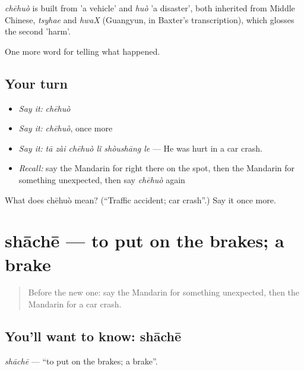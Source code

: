 \begin{cousinweb}
\emph{chēhuò} is built from  'a vehicle' and \emph{huò} 'a disaster', both inherited from Middle Chinese, \emph{tsyhae} and \emph{hwaX} (Guangyun, in Baxter's transcription), which glosses the second 'harm'.
\end{cousinweb}

\begin{grammarlens}[title={What you've built}]
One more word for telling what happened.
\end{grammarlens}

\subsection*{Your turn}
\begin{itemize}
\raggedright
  \item \emph{Say it:} \emph{chēhuò}
  \item \emph{Say it:} \emph{chēhuò}, once more
  \item \emph{Say it:} \emph{tā zài chēhuò lǐ shòushāng le} — He was hurt in a car crash.
  \item \emph{Recall:} say the Mandarin for right there on the spot, then the Mandarin for something unexpected, then say \emph{chēhuò} again
\end{itemize}

\begin{tcolorbox}[breakable,colback=teal!4,colframe=teal!35!black,title={Before you move on}]
What does chēhuò mean? (\textquotedblleft{}Traffic accident; car crash\textquotedblright{}.) Say it once more.
\end{tcolorbox}
\section[shāchē]{shāchē — to put on the brakes; a brake}

\label{lesson:ZH-C296-shache}



\begin{quote}
Before the new one: say the Mandarin for something unexpected, then the Mandarin for a car crash.
\end{quote}

\subsection*{You'll want to know: shāchē}
\emph{shāchē} — \textquotedblleft{}to put on the brakes; a brake\textquotedblright{}.


